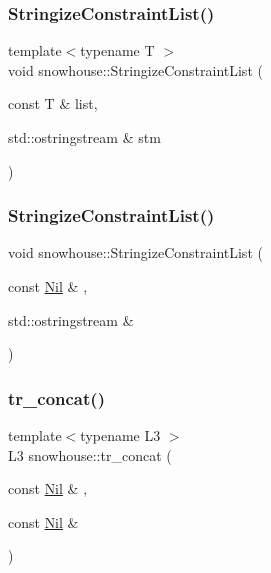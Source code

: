 \mbox{\label{namespacesnowhouse_a51108113346d79224fd94701a0ac4a0f}} 
\subsubsection{\texorpdfstring{StringizeConstraintList()}{StringizeConstraintList()}\hspace{0.1cm}{\footnotesize\ttfamily [1/2]}}
{\footnotesize\ttfamily template$<$typename T $>$ \\
void snowhouse\+::\+Stringize\+Constraint\+List (\begin{DoxyParamCaption}\item[{const T \&}]{list,  }\item[{std\+::ostringstream \&}]{stm }\end{DoxyParamCaption})\hspace{0.3cm}{\ttfamily [inline]}}

\mbox{\label{namespacesnowhouse_a085d20f5a6569245f33432e1d881d547}} 
\subsubsection{\texorpdfstring{StringizeConstraintList()}{StringizeConstraintList()}\hspace{0.1cm}{\footnotesize\ttfamily [2/2]}}
{\footnotesize\ttfamily void snowhouse\+::\+Stringize\+Constraint\+List (\begin{DoxyParamCaption}\item[{const \mbox{\hyperlink{structsnowhouse_1_1Nil}{Nil}} \&}]{,  }\item[{std\+::ostringstream \&}]{ }\end{DoxyParamCaption})\hspace{0.3cm}{\ttfamily [inline]}}

\mbox{\label{namespacesnowhouse_a95dc585af31f910717dd546909c8513a}} 
\subsubsection{\texorpdfstring{tr\_concat()}{tr\_concat()}}
{\footnotesize\ttfamily template$<$typename L3 $>$ \\
L3 snowhouse\+::tr\+\_\+concat (\begin{DoxyParamCaption}\item[{const \mbox{\hyperlink{structsnowhouse_1_1Nil}{Nil}} \&}]{,  }\item[{const \mbox{\hyperlink{structsnowhouse_1_1Nil}{Nil}} \&}]{ }\end{DoxyParamCaption})\hspace{0.3cm}{\ttfamily [inline]}}


